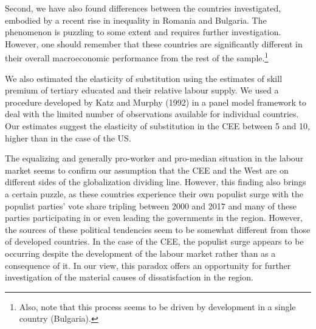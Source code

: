 \documentclass[11pt]{article}
\begin{document}
Second, we have also found differences between the countries investigated, embodied by a recent rise in inequality in Romania and Bulgaria. The phenomenon is puzzling to some extent and requires further investigation. However, one should remember that these countries are significantly different in their overall macroeconomic performance from the rest of the sample.\footnote{
Also, note that this process seems to be driven by development in a single country (Bulgaria).}

We also estimated the elasticity of substitution using the estimates of skill premium of tertiary educated and their relative labour supply. We used a procedure developed by Katz and Murphy (1992) in a panel model framework to deal with the limited number of observations available for individual countries. Our estimates suggest the elasticity of substitution in the CEE between 5 and 10, higher than in the case of the US.


The equalizing and generally pro-worker and pro-median situation in the labour market seems to confirm our assumption that the CEE and the West are on different sides of the globalization dividing line. However, this finding also brings a certain puzzle, as these countries experience their own populist surge with the populist parties' vote share tripling between 2000 and 2017 and many of these parties participating in or even leading the governments in the region. However, the sources of these political tendencies seem to be somewhat different from those of developed countries. In the case of the CEE, the populist surge appears to be occurring despite the development of the labour market rather than as a consequence of it. In our view, this paradox offers an opportunity for further investigation of the material causes of dissatisfaction in the region.













\newpage





\end{document}
